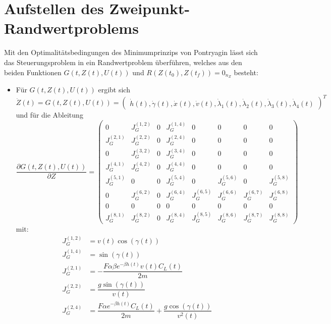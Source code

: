 \section{Aufstellen des Zweipunkt-Randwertproblems}
Mit den Optimalitätsbedingungen des Minimumprinzips von Pontryagin lässt sich das Steuerungsproblem in ein Randwertproblem überführen, welches aus den beiden Funktionen $G(t,Z(t),U(t))$ und $R(Z(t_0),Z(t_f)) = 0_{n_Z}$ besteht:
\begin{itemize}
\item Für $G(t,Z(t),U(t))$ ergibt sich
\begin{equation}
\dot{Z}(t) = G(t,Z(t),U(t)) = \begin{pmatrix}
\dot{h}(t),\dot{\gamma}(t),\dot{x}(t),\dot{v}(t),\dot{\lambda}_1(t),\dot{\lambda}_2(t),\dot{\lambda}_3(t),\dot{\lambda}_4(t)
\end{pmatrix}^T
\end{equation}
und für die Ableitung
\begin{equation}
\dfrac{\partial G(t,Z(t),U(t))}{\partial Z} = \begin{pmatrix}
0 & J_G^{(1,2)} & 0 & J_G^{(1,4)} & 0 & 0 & 0 & 0 \\ 
J_G^{(2,1)} & J_G^{(2,2)} & 0 & J_G^{(2,4)} & 0 & 0 & 0 & 0 \\ 
0 & J_G^{(3,2)} & 0 & J_G^{(3,4)} & 0 & 0 & 0 & 0 \\ 
J_G^{(4,1)} & J_G^{(4,2)} & 0 & J_G^{(4,4)} & 0 & 0 & 0 & 0 \\
J_G^{(5,1)} & 0 & 0 & J_G^{(5,4)} & 0 & J_G^{(5,6)} & 0 & J_G^{(5,8)} \\
0 & J_G^{(6,2)} & 0 & J_G^{(6,4)} & J_G^{(6,5)} & J_G^{(6,6)} & J_G^{(6,7)} & J_G^{(6,8)} \\
0 & 0 & 0 & 0 & 0 & 0 & 0 & 0 \\
J_G^{(8,1)} & J_G^{(8,2)} & 0 & J_G^{(8,4)} & J_G^{(8,5)} & J_G^{(8,6)} & J_G^{(8,7)} & J_G^{(8,8)}
\end{pmatrix}
\end{equation}
mit:
\begin{align}
J_G^{(1,2)} &= v(t) \cos(\gamma(t)) \\
J_G^{(1,4)} &= \sin(\gamma(t)) \\
J_G^{(2,1)} &= - \dfrac{F \alpha \beta e^{-\beta h(t)} v(t) C_L(t)}{2m} \\
J_G^{(2,2)} &= \dfrac{g \sin(\gamma(t))}{v(t)} \\
J_G^{(2,4)} &= \dfrac{F \alpha e^{-\beta h(t)} C_L(t)}{2m} + \dfrac{g \cos(\gamma(t))}{v^2(t)} \\

\end{align}
\end{itemize}
